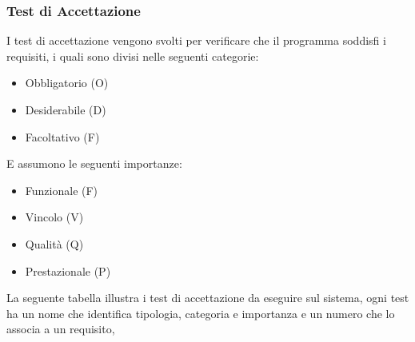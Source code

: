 \subsubsection{Test di Accettazione}
I test di accettazione vengono svolti per verificare che il programma soddisfi i requisiti, i quali sono divisi nelle seguenti categorie:
\begin{itemize}
    \item Obbligatorio (O)
    \item Desiderabile (D)
    \item Facoltativo (F)
\end{itemize}
E assumono le seguenti importanze:
\begin{itemize}
    \item Funzionale (F)
    \item Vincolo (V)
    \item Qualit\`a (Q)
    \item Prestazionale (P)
\end{itemize}
La seguente tabella illustra i test di accettazione da eseguire sul sistema, ogni test ha un nome che identifica tipologia, categoria e importanza e un numero che lo associa a un requisito,

